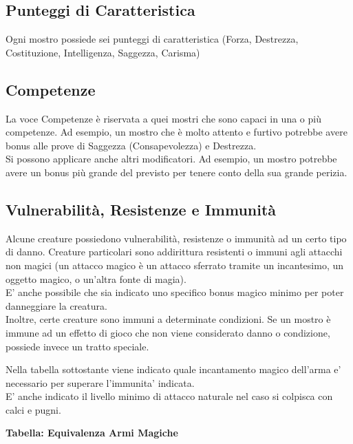 \begin{multicols}{2}
\subsection{Punteggi di Caratteristica}

Ogni mostro possiede sei punteggi di caratteristica (Forza, Destrezza, Costituzione, Intelligenza, Saggezza, Carisma)

\subsection{Competenze}

La voce Competenze è riservata a quei mostri che sono capaci in una o più competenze. Ad esempio, un mostro che è molto attento e furtivo potrebbe avere bonus alle prove di Saggezza (Consapevolezza) e Destrezza. \\
Si possono applicare anche altri modificatori. Ad esempio, un mostro potrebbe avere un bonus più grande del previsto per tenere conto della sua grande perizia.

\subsection{Vulnerabilità, Resistenze e Immunità}

Alcune creature possiedono vulnerabilità, resistenze o immunità ad un certo tipo di danno. Creature particolari sono addirittura resistenti o immuni agli attacchi non magici (un attacco magico è un attacco sferrato tramite un incantesimo, un oggetto magico, o un'altra fonte di magia). \\
E' anche possibile che sia indicato uno specifico bonus magico minimo per poter danneggiare la creatura.\\
Inoltre, certe creature sono immuni a determinate condizioni. Se  un mostro è immune ad un effetto di gioco che non viene considerato danno o condizione, possiede invece un tratto speciale.


Nella tabella sottostante viene indicato quale incantamento magico dell'arma e' necessario per superare l'immunita' indicata.\\
E' anche indicato il livello minimo di attacco naturale nel caso si colpisca con calci e pugni.

\medskip

\textbf{Tabella: Equivalenza Armi Magiche}

\medskip


\end{multicols}
